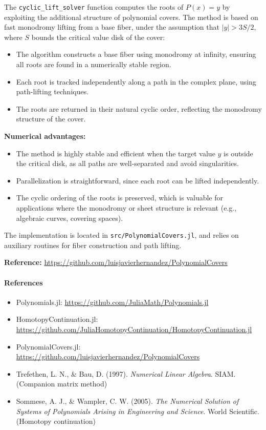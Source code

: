 \documentclass{article}
\begin{document}
The \texttt{cyclic\_lift\_solver} function computes the roots of $P(x) = y$ by exploiting the additional structure of polynomial covers. The method is based on fast monodromy lifting from a base fiber, under the assumption that $|y| > 3S/2$, where $S$ bounds the critical value disk of the cover:
\begin{itemize}
  \item The algorithm constructs a base fiber using monodromy at infinity, ensuring all roots are found in a numerically stable region.
  \item Each root is tracked independently along a path in the complex plane, using path-lifting techniques.
  \item The roots are returned in their natural cyclic order, reflecting the monodromy structure of the cover.
\end{itemize}
\textbf{Numerical advantages:}
\begin{itemize}
  \item The method is highly stable and efficient when the target value $y$ is outside the critical disk, as all paths are well-separated and avoid singularities.
  \item Parallelization is straightforward, since each root can be lifted independently.
  \item The cyclic ordering of the roots is preserved, which is valuable for applications where the monodromy or sheet structure is relevant (e.g., algebraic curves, covering spaces).
\end{itemize}
The implementation is located in \texttt{src/PolynomialCovers.jl}, and relies on auxiliary routines for fiber construction and path lifting.

\textbf{Reference:} \url{https://github.com/luisjavierhernandez/PolynomialCovers}

\paragraph{References}
\begin{itemize}
  \item Polynomials.jl: \url{https://github.com/JuliaMath/Polynomials.jl}
  \item HomotopyContinuation.jl: \url{https://github.com/JuliaHomotopyContinuation/HomotopyContinuation.jl}
  \item PolynomialCovers.jl: \url{https://github.com/luisjavierhernandez/PolynomialCovers}
  \item Trefethen, L. N., & Bau, D. (1997). \emph{Numerical Linear Algebra}. SIAM. (Companion matrix method)
  \item Sommese, A. J., & Wampler, C. W. (2005). \emph{The Numerical Solution of Systems of Polynomials Arising in Engineering and Science}. World Scientific. (Homotopy continuation)
\end{itemize}
\end{document}

